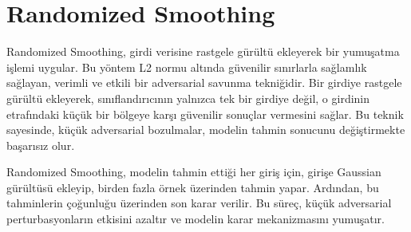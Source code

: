 \section{Randomized Smoothing}

Randomized Smoothing, girdi verisine rastgele gürültü ekleyerek bir yumuşatma işlemi uygular. Bu yöntem L2 normu altında güvenilir sınırlarla sağlamlık sağlayan, verimli ve etkili bir adversarial savunma tekniğidir. Bir girdiye rastgele gürültü ekleyerek, sınıflandırıcının yalnızca tek bir girdiye değil, o girdinin etrafındaki küçük bir bölgeye karşı güvenilir sonuçlar vermesini sağlar. Bu teknik sayesinde, küçük adversarial bozulmalar, modelin tahmin sonucunu değiştirmekte başarısız olur.

Randomized Smoothing, modelin tahmin ettiği her giriş için, girişe Gaussian gürültüsü ekleyip, birden fazla örnek üzerinden tahmin yapar. Ardından, bu tahminlerin çoğunluğu üzerinden son karar verilir. Bu süreç, küçük adversarial perturbasyonların etkisini azaltır ve modelin karar mekanizmasını yumuşatır.

\newpage